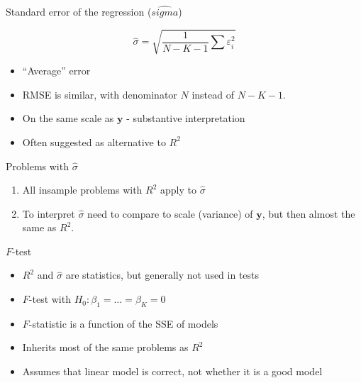 \documentclass[ignorenonframetext,]{beamer}
\providecommand{\tightlist}{%
  \setlength{\itemsep}{0pt}\setlength{\parskip}{0pt}}
\renewcommand{\vec}[1]{\boldsymbol{#1}}
\begin{document}
\begin{frame}{Standard error of the regression (\(\hat{sigma}\))}

\[
\hat{\sigma} = \sqrt{ \frac{1}{N - K - 1} \sum \varepsilon_i^2 }
\]

\begin{itemize}
\tightlist
\item
  ``Average'' error
\item
  RMSE is similar, with denominator \(N\) instead of \(N - K - 1\).
\item
  On the same scale as \(\vec{y}\) - substantive interpretation
\item
  Often suggested as alternative to \(R^2\)
\end{itemize}

\end{frame}

\begin{frame}{Problems with \(\hat{\sigma}\)}

\begin{enumerate}
\def\labelenumi{\arabic{enumi}.}
\setcounter{enumi}{1}
\tightlist
\item
  All insample problems with \(R^2\) apply to \(\hat{\sigma}\)
\item
  To interpret \(\hat{\sigma}\) need to compare to scale (variance) of
  \(\vec{y}\), but then almost the same as \(R^2\).
\end{enumerate}

\end{frame}

\begin{frame}{\(F\)-test}

\begin{itemize}
\tightlist
\item
  \(R^2\) and \(\hat{\sigma}\) are statistics, but generally not used in
  tests
\item
  \(F\)-test with \(H_0: \beta_1 = \dots = \beta_K = 0\)
\item
  \(F\)-statistic is a function of the SSE of models
\item
  Inherits most of the same problems as \(R^2\)
\item
  Assumes that linear model is correct, not whether it is a good model
\end{itemize}

\end{frame}
\end{document}
